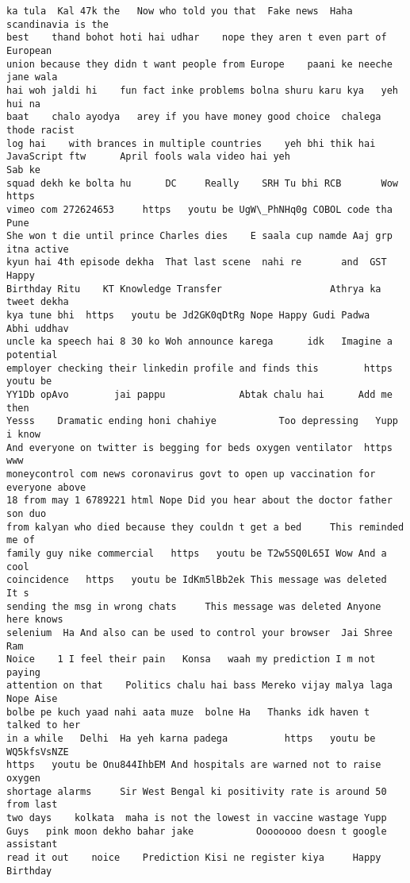 \documentclass[11pt]{article}
\begin{document}
\begin{tcolorbox}[breakable, size=fbox, boxrule=.5pt, pad at break*=1mm, opacityfill=0]
\begin{Verbatim}[commandchars=\\\{\}]
ka tula  Kal 47k the   Now who told you that  Fake news  Haha scandinavia is the
best    thand bohot hoti hai udhar    nope they aren t even part of European
union because they didn t want people from Europe    paani ke neeche jane wala
hai woh jaldi hi    fun fact inke problems bolna shuru karu kya   yeh hui na
baat    chalo ayodya   arey if you have money good choice  chalega thode racist
log hai    with brances in multiple countries    yeh bhi thik hai
JavaScript ftw      April fools wala video hai yeh                     Sab ke
squad dekh ke bolta hu      DC     Really    SRH Tu bhi RCB       Wow  https
vimeo com 272624653     https   youtu be UgW\_PhNHq0g COBOL code tha       Pune
She won t die until prince Charles dies    E saala cup namde Aaj grp itna active
kyun hai 4th episode dekha  That last scene  nahi re       and  GST        Happy
Birthday Ritu    KT Knowledge Transfer                   Athrya ka tweet dekha
kya tune bhi  https   youtu be Jd2GK0qDtRg Nope Happy Gudi Padwa   Abhi uddhav
uncle ka speech hai 8 30 ko Woh announce karega      idk   Imagine a potential
employer checking their linkedin profile and finds this        https   youtu be
YY1Db opAvo        jai pappu             Abtak chalu hai      Add me then
Yesss    Dramatic ending honi chahiye           Too depressing   Yupp i know
And everyone on twitter is begging for beds oxygen ventilator  https   www
moneycontrol com news coronavirus govt to open up vaccination for everyone above
18 from may 1 6789221 html Nope Did you hear about the doctor father son duo
from kalyan who died because they couldn t get a bed     This reminded me of
family guy nike commercial   https   youtu be T2w5SQ0L65I Wow And a cool
coincidence   https   youtu be IdKm5lBb2ek This message was deleted    It s
sending the msg in wrong chats     This message was deleted Anyone here knows
selenium  Ha And also can be used to control your browser  Jai Shree Ram
Noice    1 I feel their pain   Konsa   waah my prediction I m not paying
attention on that    Politics chalu hai bass Mereko vijay malya laga   Nope Aise
bolbe pe kuch yaad nahi aata muze  bolne Ha   Thanks idk haven t talked to her
in a while   Delhi  Ha yeh karna padega          https   youtu be WQ5kfsVsNZE
https   youtu be Onu844IhbEM And hospitals are warned not to raise oxygen
shortage alarms     Sir West Bengal ki positivity rate is around 50  from last
two days    kolkata  maha is not the lowest in vaccine wastage Yupp
Guys   pink moon dekho bahar jake           Oooooooo doesn t google assistant
read it out    noice    Prediction Kisi ne register kiya     Happy Birthday

\end{Verbatim}
\end{tcolorbox}
\end{document}
